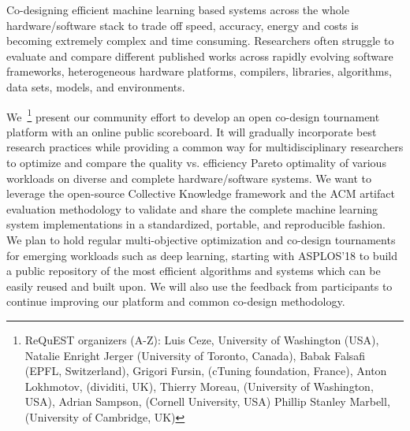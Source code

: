 Co-designing efficient machine learning based systems across
the whole hardware/software stack to trade off speed, accuracy, energy
and costs is becoming extremely complex and time consuming.
%
Researchers often struggle to evaluate and compare different
published works across rapidly evolving software
frameworks, heterogeneous hardware platforms, compilers,
libraries, algorithms, data sets, models, and environments.

We~\footnote{ReQuEST organizers (A-Z): 
Luis Ceze, University of Washington (USA),
Natalie Enright Jerger (University of Toronto, Canada),
Babak Falsafi (EPFL, Switzerland),
Grigori Fursin, (cTuning foundation, France),
Anton Lokhmotov, (dividiti, UK),
Thierry Moreau, (University of Washington, USA),
Adrian Sampson, (Cornell University, USA)
Phillip Stanley Marbell, (University of Cambridge, UK)}
present our community effort to develop an open co-design tournament 
platform with an online public scoreboard.
%
It will gradually incorporate best research practices 
while providing a common way for multidisciplinary researchers
to optimize and compare the quality vs. efficiency Pareto
optimality of various workloads on diverse and complete
hardware/software systems.
%
We want to leverage the open-source Collective Knowledge framework
and the ACM artifact evaluation methodology to validate and share the complete 
machine learning system implementations
in a standardized, portable, and reproducible fashion.
%
We plan to hold regular multi-objective optimization and co-design tournaments 
for emerging workloads such as deep learning, starting with ASPLOS'18 
to build a public repository of the most efficient algorithms and systems
which can be easily reused and built upon.
%
We will also use the feedback from participants to continue improving
our platform and common co-design methodology.

